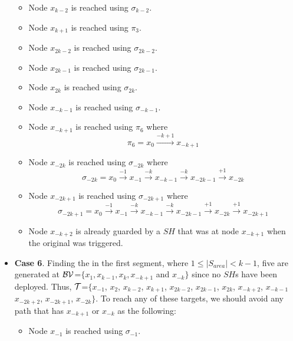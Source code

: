 \begin{itemize}
\begin{itemize}
\item Node $x_{k-2}$ is reached using $\sigma_{k-2}$.

\item Node $x_{k+1}$ is reached using $\pi_3$.

\item Node $x_{2k-2}$ is reached using $\sigma_{2k-2}$. 
\item Node $x_{2k-1}$ is reached using $\sigma_{2k-1}$. 

\item Node $x_{2k}$ is reached using $\sigma_{2k}$. 


\item Node $x_{-k-1}$ is reached using $\sigma_{-k-1}$.
\item Node $x_{-k+1}$ is reached using $\pi_6$ where
$$\pi_{6} = x_{0} \xrightarrow {-k+1} x_{-k+1} $$
\item Node $x_{-2k}$ is reached using $\sigma_{-2k}$  where 
$$\sigma_{-2k} = x_{0} \xrightarrow {-1} x_{-1} \xrightarrow {-k} x_{-k-1} \xrightarrow {-k} x_{-2k-1} \xrightarrow {+1} x_{-2k}$$
\item Node $x_{-2k+1}$ is reached using $\sigma_{-2k+1}$  where 
$$\sigma_{-2k+1} = x_{0} \xrightarrow {-1} x_{-1} \xrightarrow {-k} x_{-k-1} \xrightarrow {-k} x_{-2k-1} \xrightarrow {+1} x_{-2k}\xrightarrow {+1} x_{-2k+1}$$


\item Node $x_{-k+2}$ is already guarded by a $SH$ that was at node $x_{-k+1}$ when the original \bv was triggered.


\end{itemize}






\item {\bf Case 6}. Finding the \bv in the first segment, where $1\leq |S_{area}|<k-1$, five \bvs are generated at $\cal BV$=$\{x_1,x_{k-1},x_k,x_{-k+1}$ and $x_{-k}\}$ since no $SH$s have been deployed. Thus,
$\cal T$=$\{x_{-1}$, $ x_{2}$,  $x_{k-2}$, $x_{k+1}$, $x_{2k-2}$, $x_{2k-1}$, $x_{2k}$, $x_{-k+2}$, $x_{-k-1}$  $x_{-2k+2}$, $x_{-2k+1}$, $x_{-2k} \}$. To reach any of these targets, we should avoid any path that has $x_{-k+1}$ or $x_{-k}$ as the following:
\begin{itemize}
\item Node $x_{-1}$ is reached using $\sigma_{-1}$.



\end{itemize}
\end{itemize}
